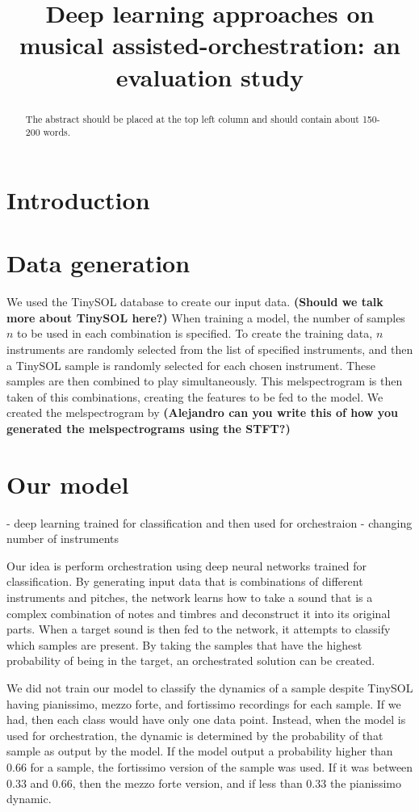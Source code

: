 \documentclass{article}
\title{Deep learning approaches on musical assisted-orchestration: an evaluation study}
\begin{document}
%
\maketitle
%
\begin{abstract}
The abstract should be placed at the top left column and should contain about 150-200 words.
\end{abstract}
%
\section{Introduction}\label{sec:introduction}

\section{Data generation}
We used the TinySOL database to create our input data. \textbf{(Should we talk more about TinySOL here?)} When training a model, the number of samples $n$ to be used in each combination is specified. To create the training data, $n$ instruments are randomly selected from the list of specified instruments, and then a TinySOL sample is randomly selected for each chosen instrument. These samples are then combined to play simultaneously. This melspectrogram is then taken of this combinations, creating the features to be fed to the model. We created the melspectrogram by \textbf{(Alejandro can you write this of how you generated the melspectrograms using the STFT?)}

\section{Our model}
- deep learning trained for classification and then used for orchestraion
- changing number of instruments

Our idea is perform orchestration using deep neural networks trained for classification. By generating input data that is combinations of different instruments and pitches, the network learns how to take a sound that is a complex combination of notes and timbres and deconstruct it into its original parts. When a target sound is then fed to the network, it attempts to classify which samples are present. By taking the samples that have the highest probability of being in the target, an orchestrated solution can be created. 

We did not train our model to classify the dynamics of a sample despite TinySOL having pianissimo, mezzo forte, and fortissimo recordings for each sample. If we had, then each class would have only one data point. Instead, when the model is used for orchestration, the dynamic is determined by the probability of that sample as output by the model. If the model output a probability higher than $0.66$ for a sample, the fortissimo version of the sample was used. If it was between $0.33$ and $0.66$, then the mezzo forte version, and if less than $0.33$ the pianissimo dynamic.
\end{document}

